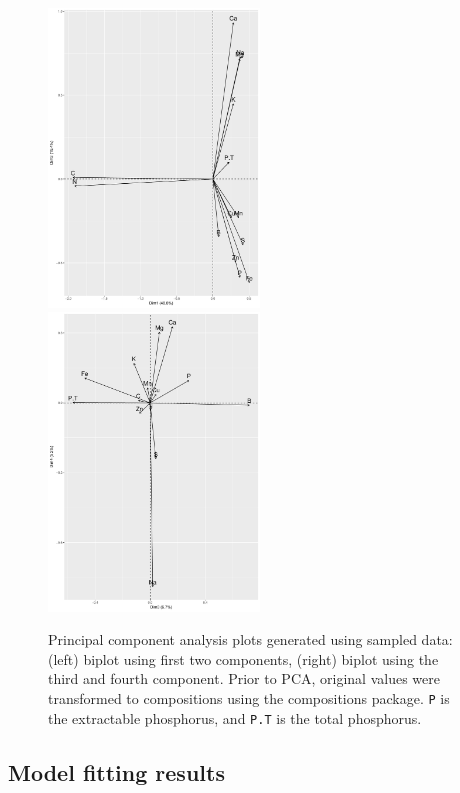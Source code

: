 \begin{linenumbers}
\begin{figure}[!hbt]
\includegraphics[width=0.5\textwidth]{Fig_prcomp_1_2_biplot.pdf}
\includegraphics[width=0.5\textwidth]{Fig_prcomp_3_4_biplot.pdf}
\caption{Principal component analysis plots generated using sampled data: (left) biplot using first two components, (right) biplot using the third and fourth component. Prior to PCA, original values were transformed to compositions using the \textsf{compositions} package. \texttt{P} is the extractable phosphorus, and \texttt{P.T} is the total phosphorus.}
\label{fig:biplots}
\end{figure}

\subsection{Model fitting results}


\end{linenumbers}
